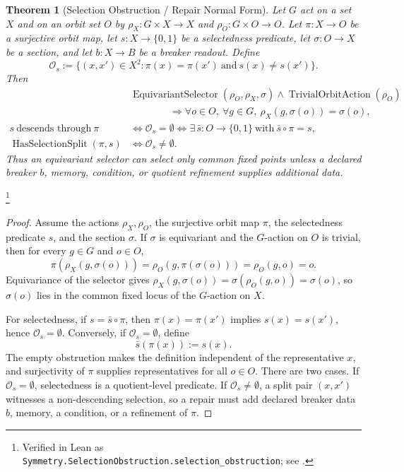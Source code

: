 \documentclass[11pt]{article}
\newtheorem{theorem}{Theorem}[section]
\theoremstyle{definition}
\begin{document}
\begin{theorem}[Selection Obstruction / Repair Normal Form]\label{thm:F15a}
Let \(G\) act on a set \(X\) and on an orbit set \(O\) by
\(\rho_X:G\times X\to X\) and \(\rho_O:G\times O\to O\).  Let
\(\pi:X\to O\) be a surjective orbit map, let
\(s:X\to\{0,1\}\) be a selectedness predicate, let
\(\sigma:O\to X\) be a section, and let \(b:X\to B\) be a breaker
readout.  Define
\[
  \mathcal O_s
  :=
  \{(x,x')\in X^2:\pi(x)=\pi(x')\ \text{and}\ s(x)\ne s(x')\}.
\]
Then
\begin{align*}
  &\operatorname{EquivariantSelector}(\rho_O,\rho_X,\sigma)
    \wedge \operatorname{TrivialOrbitAction}(\rho_O)\\
  &\hspace{4em}\Longrightarrow
    \forall o\in O,\ \forall g\in G,\
      \rho_X(g,\sigma(o))=\sigma(o),\\
  s\ \text{descends through}\ \pi
  &\iff
  \mathcal O_s=\emptyset
  \iff
  \exists\,\bar s:O\to\{0,1\}\ \text{with}\ \bar s\circ\pi=s,\\
  \operatorname{HasSelectionSplit}(\pi,s)
  &\iff
  \mathcal O_s\ne\emptyset.
\end{align*}
Thus an equivariant selector can select only common fixed points
unless a declared breaker \(b\), memory, condition, or quotient
refinement supplies additional data.
\end{theorem}
\footnote{Verified in Lean as
\texttt{Symmetry.SelectionObstruction.selection\_obstruction}; see
\Cref{app:formalization}.}
\begin{proof}
Assume the actions \(\rho_X,\rho_O\), the surjective orbit map
\(\pi\), the selectedness predicate \(s\), and the section
\(\sigma\).  If \(\sigma\) is equivariant and the \(G\)-action on
\(O\) is trivial, then for every \(g\in G\) and \(o\in O\),
\[
  \pi(\rho_X(g,\sigma(o)))
  =
  \rho_O(g,\pi(\sigma(o)))
  =
  \rho_O(g,o)
  =
  o.
\]
Equivariance of the selector gives
\(\rho_X(g,\sigma(o))=\sigma(\rho_O(g,o))=\sigma(o)\), so
\(\sigma(o)\) lies in the common fixed locus of the \(G\)-action on
\(X\).

For selectedness, if \(s=\bar s\circ\pi\), then
\(\pi(x)=\pi(x')\) implies \(s(x)=s(x')\), hence
\(\mathcal O_s=\emptyset\).  Conversely, if
\(\mathcal O_s=\emptyset\), define
\[
  \bar s(\pi(x)):=s(x).
\]
The empty obstruction makes the definition independent of the
representative \(x\), and surjectivity of \(\pi\) supplies
representatives for all \(o\in O\).  There are two cases.  If
\(\mathcal O_s=\emptyset\), selectedness is a quotient-level
predicate.  If \(\mathcal O_s\ne\emptyset\), a split pair
\((x,x')\) witnesses a non-descending selection, so a repair must add
declared breaker data \(b\), memory, a condition, or a refinement of
\(\pi\).
\end{proof}
\end{document}
